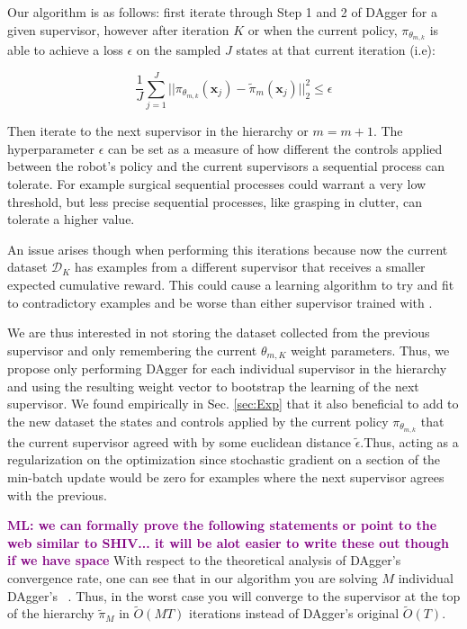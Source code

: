 \documentclass[10pt, conference]{ieeeconf}      %
\newcommand{\mlnote}[1]{\ifthenelse{ \boolean{include-notes}}%
 {\textcolor{purple}{\textbf{ML: #1}}}{}}
\begin{document}
Our algorithm is as follows: first iterate through Step 1 and 2 of DAgger for a given supervisor, however after iteration $K$ or when the current policy, $\pi_{\theta_{m,k}}$ is able to achieve a loss $\epsilon$ on the sampled $J$ states at that current iteration (i.e): 

$$\frac{1}{J} \sum^J_{j=1} ||\pi_{\theta_{m,k}}(\mathbf{x}_j) - \tilde{\pi}_m(\mathbf{x}_j) ||^2_2 \leq \epsilon$$

Then iterate to the next supervisor in the hierarchy or $m = m+1$. The hyperparameter $\epsilon$ can be set as a measure of how different the controls applied between the robot's policy and the current supervisors a sequential process can tolerate. For example surgical sequential processes could warrant a very low threshold, but less precise sequential processes, like grasping in clutter, can tolerate a higher value. 

An issue arises though when performing this iterations because now the current dataset $\mathcal{D}_K$ has examples from a different supervisor that receives a smaller expected cumulative reward. This could cause a learning algorithm to try and fit to contradictory examples  and be worse than either supervisor trained with \cite{scholkopf2002learning}.

We are thus interested in not storing the dataset collected from the previous supervisor and only remembering the current $\theta_{m,K}$ weight parameters. Thus, we propose only performing DAgger for each individual supervisor in the hierarchy and using the resulting weight vector to bootstrap the learning of the next supervisor. We found empirically in Sec. \ref{sec:Exp} that it also beneficial to add to the new dataset the states and controls applied by the current policy $\pi_{\theta_{m,k}}$ that the current supervisor agreed with by some euclidean distance $\tilde{\epsilon}$.Thus, acting as a regularization on the optimization since stochastic gradient on a section of the min-batch update would be zero for examples where the next supervisor agrees with the previous. 


\mlnote{we can formally prove the following statements or point to the web similar to SHIV... it will be alot easier to write these out though if we have space}
With respect to the theoretical analysis of DAgger's convergence rate, one can see that in our algorithm you are solving $M$ individual DAgger's ~\cite{ross2010reduction}. Thus, in the worst case you will converge to the supervisor at the top of the hierarchy $\tilde{\pi}_M$ in $\tilde{O}(MT)$ iterations instead of DAgger's original $\tilde{O}(T)$. 
\end{document}

